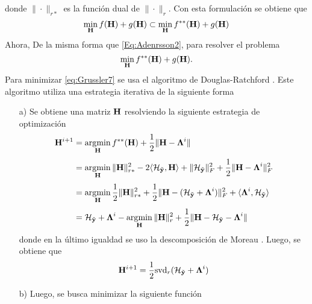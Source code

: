         donde $\|\cdot\|_{r*}$ es la función dual de $\|\cdot\|_r$.
        Con esta formulación se obtiene que
        \begin{equation}
            \min_{\mathbf{H}} f(\mathbf{H}) + g(\mathbf{H}) \subset \min_{\mathbf{H}} f^{**}(\mathbf{H}) + g(\mathbf{H})
            \label{eq:Grussler6}
        \end{equation}
        Ahora,  De la misma forma que \eqref{Eq:Adenrsson2}, para resolver el problema
        \begin{equation}
            \min_{\mathbf{H}} f^{**}(\mathbf{H}) + g(\mathbf{H}).
            \label{eq:Grussler7}
        \end{equation}
        Para minimizar \eqref{eq:Grussler7} se usa el algoritmo de Douglas-Ratchford \cite{Parikh2014}. Este algoritmo utiliza una estrategia iterativa de la siguiente forma
        \begin{itemize}
            \item[a)] Se obtiene una matriz $\mathbf{H}$ resolviendo la siguiente estrategia de optimización
            \begin{equation}
                \begin{aligned}
                    \mathbf{H}^{i+1} & = \operatorname*{\arg\!\min}_{\mathbf{H}} f^{**}(\mathbf{H}) + \frac{1}{2}\|\mathbf{H}-\boldsymbol{\Lambda}^i\| \\[0.3em]
                    & = \operatorname*{\arg\!\min}_{\mathbf{H}} \|\mathbf{H}\|_{r*}^2 - 2\langle\mathcal{H}_{\tilde{\mathbf{y}}},\mathbf{H}\rangle + \|\mathcal{H}_{\tilde{\mathbf{y}}}\|_F^2 + \frac{1}{2}\|\mathbf{H}-\boldsymbol{\Lambda}^{i}\|_F^2 \\[0.3em]
                    & = \operatorname*{\arg\!\min}_{\mathbf{H}} \frac{1}{2}\|\mathbf{H}\|_{r*}^2 + \frac{1}{2}\|\mathbf{H} - (\mathcal{H}_{\tilde{\mathbf{y}}}+\boldsymbol{\Lambda}^{i})\|_F^2 + \langle \boldsymbol{\Lambda}^{i},\mathcal{H}_{\tilde{\mathbf{y}}}\rangle \\[0.3em]
                    & = \mathcal{H}_{\tilde{\mathbf{y}}} + \boldsymbol{\Lambda}^{i}-\operatorname*{\arg\!\min}_{\mathbf{H}} \|\mathbf{H}\|_r^2 + \frac{1}{2}\|\mathbf{H}-\mathcal{H}_{\tilde{\mathbf{y}}}-\boldsymbol{\Lambda}^{i}\|
                \end{aligned}
                \label{eq:Grussler8}
            \end{equation}
            donde en la último igualdad se uso la descomposición de Moreau \cite{Parikh2014}.
            Luego, se obtiene que \cite{Grussler2021}
            \begin{equation}
                \mathbf{H}^{i+1} = \frac{1}{2}\mathrm{svd}_r(\mathcal{H}_{\tilde{\mathbf{y}}}+\boldsymbol{\Lambda}^{i})
            \end{equation}
            \item[b)] Luego, se busca minimizar la siguiente función
            \begin{equation}

\end{equation}
\end{itemize}
